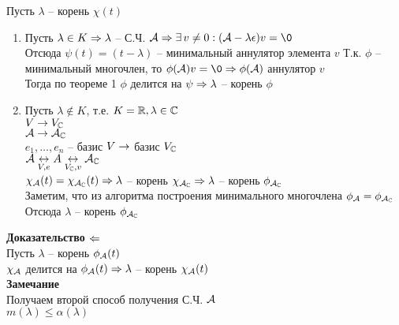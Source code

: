 \documentclass[12pt]{article}
\begin{document}
Пусть $\lambda$ -- корень $\chi(t)$
\begin{enumerate}
    \item Пусть $\lambda \in K \Rightarrow \lambda$ -- С.Ч. $\mcA \Rto \ex v \neq 0: (\mcA - \lambda \epsilon)v = \0$\\
    Отсюда $\psi(t) = (t-\lambda)$ -- минимальный аннулятор элемента $v$
    Т.к. $\phi$ -- минимальный многочлен, то $\phi(\mcA) v = \0 \Rto \phi(\mcA)$ аннулятор $v$\\
    Тогда по теореме 1 $\phi$ делится на $\psi \Rightarrow \lambda$ -- корень $\phi$
    \item Пусть $\lambda \not\in K$, т.е. $K = \mathbb{R}, \lambda \in \mathbb{C}$\\
    $V \rightarrow V_\mathbb{C}$\\
    $\mathcal{A} \rightarrow \mathcal{A}_\mathbb{C}$\\
    $e_1, \ldots, e_n$ -- базис $V \rightarrow$ базис $V_\mathbb{C}$\\
    $\mathcal{A} \underset{V, e}{\leftrightarrow} A \underset{V_\mathbb{C}, v} {\leftrightarrow} \mathcal{A}_\mathbb{C}$\\
    $\chi_\mathcal{A}(t) = \chi_{\mathcal{A}_\mathbb{C}}(t) \Rightarrow \lambda$ -- корень $\chi_{\mathcal{A}_\mathbb{C}} \Rightarrow \lambda$ -- корень $\phi_{\mathcal{A}_\mathbb{C}}$\\
    Заметим, что из алгоритма построения минимального многочлена $\phi_\mathcal{A} = \phi_{\mathcal{A}_\mathbb{C}}$\\
    Отсюда $\lambda$ -- корень $\phi_{\mathcal{A}_\mathbb{C}}$
\end{enumerate}
\textbf{Доказательство $\Leftarrow$}\\
Пусть $\lambda$ -- корень $\phi_\mathcal{A}(t)$\\
$\chi_\mathcal{A}$ делится на $\phi_\mathcal{A}(t) \Rightarrow \lambda$ -- корень $\chi_\mathcal{A}(t)$\\
\textbf{Замечание}\\
Получаем второй способ получения С.Ч. $\mathcal{A}$\\
$m(\lambda) \leq \alpha(\lambda)$
\end{document}
